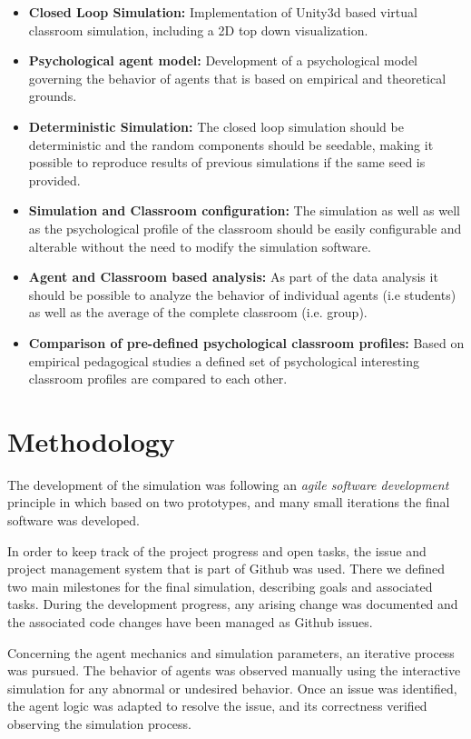 \begin{itemize}
    \item \textbf{Closed Loop Simulation:} Implementation of Unity3d based virtual
    classroom simulation, including a 2D top down visualization.
    \item \textbf{Psychological agent model:} Development of a psychological model
    governing the behavior of agents that is based on empirical and theoretical grounds.
    \item \textbf{Deterministic Simulation:} The closed loop simulation should be
    deterministic and the random components should be seedable, making it possible
    to reproduce results of previous simulations if the same seed is provided.
    \item \textbf{Simulation and Classroom configuration:} The simulation as well
    as well as the psychological profile of the classroom should be easily configurable
    and alterable without the need to modify the simulation software.
    \item \textbf{Agent and Classroom based analysis:} As part of the data analysis
    it should be possible to analyze the behavior of individual agents (i.e students)
    as well as the average of the complete classroom (i.e. group).
    \item \textbf{Comparison of pre-defined psychological classroom profiles:} Based
    on empirical pedagogical studies a defined set of psychological interesting classroom
    profiles are compared to each other.
\end{itemize}

\section{Methodology}
The development of the simulation was following an \textit{agile software development}
principle in which based on two prototypes, and many small iterations the final
software was developed.

\bb

In order to keep track of the project progress and open tasks, the issue and project
management system that is part of Github was used. There we defined two main milestones
for the final simulation, describing goals and associated tasks.
During the development progress, any arising change was documented and the associated
code changes have been managed as Github issues.

\bb

Concerning the agent mechanics and simulation parameters, an iterative process was
pursued. The behavior of agents was observed manually using the interactive simulation
for any abnormal or undesired behavior. Once an issue was identified, the agent logic
was adapted to resolve the issue, and its correctness verified observing the
simulation process.

